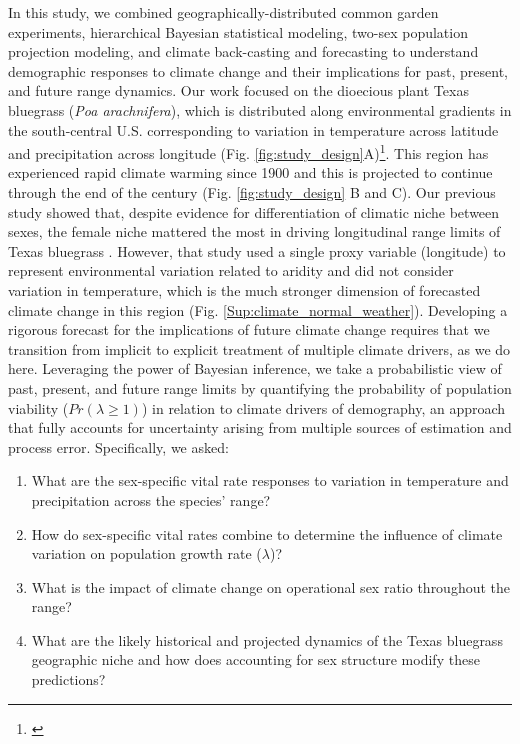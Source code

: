 \documentclass[12pt]{article}\usepackage[]{graphicx}\usepackage[dvipsnames]{xcolor}
\newcommand{\jacob}[2]{{\color{blue}{#1}}\footnote{\textit{\color{blue}{#2}}}}
\begin{document}
In this study, we combined geographically-distributed common garden experiments, hierarchical Bayesian statistical modeling, two-sex population projection modeling, and climate back-casting and forecasting to understand demographic responses to climate change and their implications for past, present, and future range dynamics. 
Our work focused on the dioecious plant Texas bluegrass (\textit{Poa arachnifera}), which is distributed along environmental gradients in the south-central U.S. corresponding to variation in temperature across latitude and precipitation across longitude (Fig. \ref{fig:study_design}A)\jacob{}{Fig. A  does not show what we are saying here. Maybe I should add the Figure with the raster}. 
This region has experienced rapid climate warming since 1900 and this is projected to continue through the end of the century (Fig. \ref{fig:study_design} B and C). 
Our previous study showed that, despite evidence for differentiation of climatic niche between sexes, the female niche mattered the most in driving longitudinal range limits of Texas bluegrass \citep{miller2022two}. 
However, that study used a single proxy variable (longitude) to represent environmental variation related to aridity and did not consider variation in temperature, which is the much stronger dimension of forecasted climate change in this region (Fig. \ref{Sup:climate_normal_weather}). 
Developing a rigorous forecast for the implications of future climate change requires that we transition from implicit to explicit treatment of multiple climate drivers, as we do here.
Leveraging the power of Bayesian inference, we take a probabilistic view of past, present, and future range limits by quantifying the probability of population viability ($Pr(\lambda\ge1)$) in relation to climate drivers of demography, an approach that fully accounts for uncertainty arising from multiple sources of estimation and process error. %
Specifically, we asked: 
\begin{enumerate}
	\item What are the sex-specific vital rate responses to variation in temperature and precipitation across the species' range?
	\item How do sex-specific vital rates combine to determine the influence of climate variation on population growth rate ($\lambda$)?
	\item What is the impact of climate change on operational sex ratio throughout the range?
	\item What are the likely historical and projected dynamics of the Texas bluegrass geographic niche and how does accounting for sex structure modify these predictions?
\end{enumerate}
\end{document}
